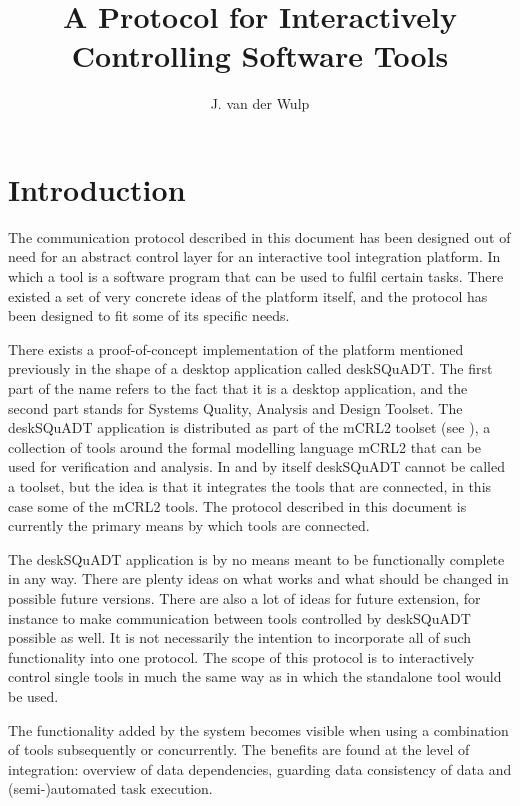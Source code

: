 \documentclass{article}
\title{A Protocol for Interactively Controlling Software Tools}
\author{J. van der Wulp}
\begin{document}
\maketitle

 \section{Introduction}

  The communication protocol described in this document has been designed out
  of need for an abstract control layer for an interactive tool integration
  platform. In which a tool is a software program that can be used to fulfil
  certain tasks. There existed a set of very concrete ideas of the platform
  itself, and the protocol has been designed to fit some of its specific needs.

  There exists a proof-of-concept implementation of the platform mentioned
  previously in the shape of a desktop application called deskSQuADT. The first
  part of the name refers to the fact that it is a desktop application, and the
  second part stands for Systems Quality, Analysis and Design Toolset.  The
  deskSQuADT application is distributed as part of the mCRL2 toolset (see
  \cite{groote_et_al:DSP:2007:862}), a collection of tools around the formal
  modelling language mCRL2 that can be used for verification and analysis.  In
  and by itself deskSQuADT cannot be called a toolset, but the idea is that it
  integrates the tools that are connected, in this case some of the mCRL2
  tools.   The protocol described in this document is currently the primary
  means by which tools are connected.

  The deskSQuADT application is by no means meant to be functionally complete
  in any way. There are plenty ideas on what works and what should be changed
  in possible future versions.  There are also a lot of ideas for future
  extension, for instance to make communication between tools controlled by
  deskSQuADT possible as well.  It is not necessarily the intention to
  incorporate all of such functionality into one protocol. The scope of this
  protocol is to interactively control single tools in much the same way as in
  which the standalone tool would be used.
  
  The functionality added by the system becomes visible when using a
  combination of tools subsequently or concurrently. The benefits are found at
  the level of integration: overview of data dependencies, guarding data
  consistency of data and (semi-)automated task execution.
\end{document}
